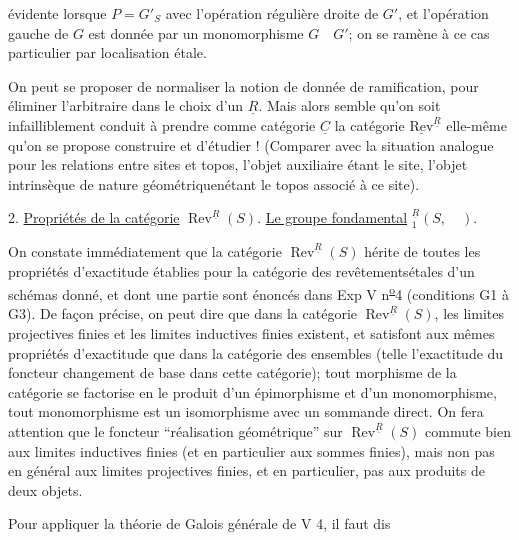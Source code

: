 évidente lorsque $P=G'_S$ avec l'opération régulière droite de $G'$, et l'opération gauche de $G$ est donnée par un monomorphisme $G\quad G'$; on se ramène à ce cas particulier par localisation étale.

On peut se proposer de normaliser la notion de donnée de ramification, pour éliminer l'arbitraire dans le choix d'un $\underline{R}$. Mais alors  semble qu'on soit infailliblement conduit à prendre comme catégorie $\underline{C}$ la catégorie $\underline{\mathrm{Rev}}^{\underline{R}}$ elle-même qu'on se propose  construire et d'étudier ! (Comparer avec la situation analogue pour les relations entre sites et topos, l'objet auxiliaire étant le site, l'objet intrinsèque de nature géométriquenétant le topos associé à ce site).

2. \uline{Propriétés de la catégorie} $\operatorname{Rev}^{\underline{R}}(S)$. \uline{Le groupe fondamental} ${}^{\underline{R}}_1(S,\quad)$.

On constate immédiatement que la catégorie $\operatorname{Rev}^{\underline{R}}(S)$ hérite de toutes les propriétés d'exactitude  établies pour la catégorie des revêtementsétales d'un schémas donné, et dont une partie sont énoncés dans Exp V n\textsuperscript{\uline{o}}4 (conditions G1 à G3). De façon précise, on peut dire que dans la catégorie $\operatorname{Rev}^{\underline{R}}(S)$, les limites projectives finies et les limites inductives finies existent, et satisfont aux mêmes propriétés d'exactitude que dans la catégorie des ensembles (telle l'exactitude du foncteur changement de base dans cette catégorie);   tout morphisme de la catégorie se factorise en le produit d'un épimorphisme et d'un monomorphisme,  tout monomorphisme est un isomorphisme avec un sommande direct. On fera attention que le foncteur ``réalisation géométrique'' sur $\operatorname{Rev}^{\underline{R}}(S)$ commute bien aux limites inductives finies (et  en particulier aux sommes finies), mais non pas en général aux limites projectives finies, et en particulier, pas aux produits de deux objets.

Pour appliquer la théorie de Galois générale de V 4, il faut dis%
